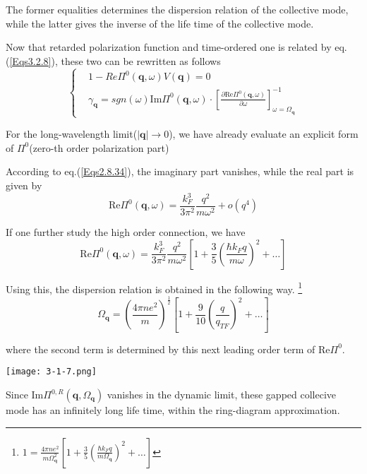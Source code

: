 The former equalities determines the dispersion relation of the collective mode, while the latter gives the inverse of the life time of the collective mode.

Now that retarded polarization function and time-ordered one is related by eq.(\ref{Eqs3.2.8}), these two can be rewritten as follows
\begin{equation*} \label{Eqs3.2.12'} \tag{3.2.12'}
\left\{ \begin{split}
&1- Re\Pi^{0}(\mathbf{q},\omega) V(\mathbf{q}) = 0\\
&\gamma_{\mathbf{q}} = sgn(\omega) \text{Im} \Pi^{0}(\mathbf{q},\omega) \cdot 
 \left[ \frac{\partial \text{Re} \Pi^{0}(\mathbf{q},\omega)}{\partial \omega} \right]_{\omega=\Omega_{\mathbf{q}}}^{-1}
\end{split} \right.
\end{equation*}

For the long-wavelength limit($|\mathbf{q}| \rightarrow 0$), we have already evaluate an explicit form of $\Pi^0$(zero-th order polarization part)

According to eq.(\ref{Eqs2.8.34}), the imaginary part vanishes, while the real part is given by
\[\text{Re} \Pi^0(\mathbf{q},\omega) = \frac{k_F^3}{3\pi^2}\frac{q^2}{m\omega^2} + o(q^4)\]

If one further study the high order connection, we have
\[\text{Re} \Pi^0(\mathbf{q},\omega) = \frac{k_F^3}{3\pi^2}\frac{q^2}{m\omega^2}\left[ 1+\frac{3}{5}\left( \frac{\hbar k_F q}{m \omega} \right)^2+\ldots \right]\]

Using this, the dispersion relation is obtained in the following way.
\footnote{$1 = \frac{4\pi n e^2}{m \Omega_{\mathbf{q}}^2}\left[ 1+\frac{3}{5}\left( \frac{\hbar k_F q}{m \Omega_{\mathbf{q}}} \right)^2+\ldots \right]$}
\begin{equation} \label{Eqs3.2.13}
\Omega_{\mathbf{q}} = \left(\frac{4\pi n e^2}{m}\right)^{\frac{1}{2}}\left[ 1+\frac{9}{10}\left( \frac{q}{q_{TF}} \right)^2+\ldots \right]
\end{equation}

where the second term is determined by this next leading order term of $\text{Re} \Pi^0$.

\begin{center} \label{Fig3.1.7}
\texttt{[image: 3-1-7.png]}
\end{center}

Since $\text{Im} \Pi^{0,R}(\mathbf{q},\Omega_{\mathbf{q}})$ vanishes in the dynamic limit, these gapped collecive mode has an infinitely long life time, within the ring-diagram approximation.

